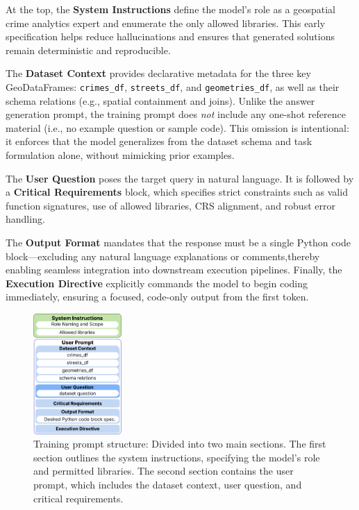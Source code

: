 At the top, the \textbf{System Instructions} define the model’s role as a geospatial crime analytics expert and enumerate the only allowed libraries. This early specification helps reduce hallucinations and ensures that generated solutions remain deterministic and reproducible.

The \textbf{Dataset Context} provides declarative metadata for the three key GeoDataFrames: \texttt{crimes\_df}, \texttt{streets\_df}, and \texttt{geometries\_df}, as well as their schema relations (e.g., spatial containment and joins). Unlike the answer generation prompt, the training prompt does \emph{not} include any one-shot reference material (i.e., no example question or sample code). This omission is intentional: it enforces that the model generalizes from the dataset schema and task formulation alone, without mimicking prior examples.

The \textbf{User Question} poses the target query in natural language. It is followed by a \textbf{Critical Requirements} block, which specifies strict constraints such as valid function signatures, use of allowed libraries, CRS alignment, and robust error handling.

The \textbf{Output Format} mandates that the response must be a single Python code block—excluding any natural language explanations or comments,thereby enabling seamless integration into downstream execution pipelines. Finally, the \textbf{Execution Directive} explicitly commands the model to begin coding immediately, ensuring a focused, code-only output from the first token.

\begin{figure}[hbtp]
  \centering
  \includegraphics[width=0.3\textwidth]{images/prompt.png}
  \caption{Training prompt structure: Divided into two main sections. The first section outlines the system instructions, specifying the model's role and permitted libraries. The second section contains the user prompt, which includes the dataset context, user question, and critical requirements.}
  \label{fig:training_prompt_structure}
\end{figure}


